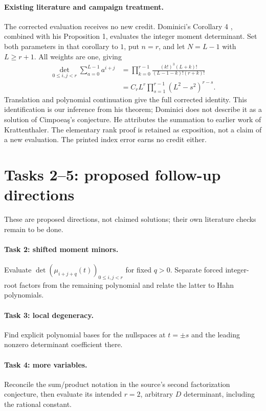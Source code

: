 \documentclass[11pt]{article}
\begin{document}
\paragraph{Existing literature and campaign treatment.}
The corrected evaluation receives no new credit. Dominici's
Corollary 4 \cite{D}, combined with his Proposition 1, evaluates
the integer moment determinant. Set both parameters in that
corollary to $1$, put $n=r$, and let $N=L-1$ with $L\geq r+1$.
All weights are one, giving
\begin{align*}
 \det_{0\leq i,j<r}\sum_{a=0}^{L-1}a^{i+j}
 &=\prod_{k=0}^{r-1}
       \frac{(k!)^3(L+k)!}{(L-1-k)!(r+k)!}\\
 &=C_r L^r\prod_{s=1}^{r-1}(L^2-s^2)^{r-s}.
\end{align*}
Translation and polynomial continuation give the full corrected
identity. This identification is our inference from his theorem;
Dominici does not describe it as a solution of Cimpoea\c{s}'s
conjecture. He attributes the summation to earlier work of
Krattenthaler. The elementary rank proof is retained as exposition,
not a claim of a new evaluation. The printed index error earns
no credit either.

\section*{Tasks 2--5: proposed follow-up directions}
These are proposed directions, not claimed solutions; their own
literature checks remain to be done.
\paragraph{Task 2: shifted moment minors.}
Evaluate $\det(\mu_{i+j+q}(t))_{0\leq i,j<r}$ for fixed $q>0$.
Separate forced integer-root factors from the remaining polynomial
and relate the latter to Hahn polynomials.
\paragraph{Task 3: local degeneracy.}
Find explicit polynomial bases for the nullspaces at $t=\pm s$
and the leading nonzero determinant coefficient there.
\paragraph{Task 4: more variables.}
Reconcile the sum/product notation in the source's second
factorization conjecture, then evaluate its intended $r=2$,
arbitrary $D$ determinant, including the rational constant.
\end{document}
